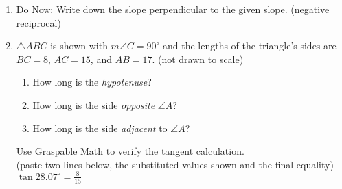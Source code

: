 \documentclass[12pt, twoside]{article}
\begin{document}
\begin{enumerate}
\newpage
\item Do Now: Write down the slope perpendicular to the given slope. (negative reciprocal) \vspace{0.5cm}
\begin{enumerate}
\end{enumerate}

\newpage
\item $\triangle ABC$ is shown with $m\angle C=90^\circ$ and the lengths of the triangle's sides are $BC=8$, $AC=15$, and $AB=17$. (not drawn to scale)
  \begin{multicols}{2}
    \begin{enumerate}
      \item How long is the \emph{hypotenuse}? \vspace{0.75cm}
      \item How long is the side \emph{opposite} $\angle A$? \vspace{0.75cm}
      \item How long is the side \emph{adjacent} to $\angle A$? \vspace{0.75cm}
    \end{enumerate}
    \end{multicols}
    Use Graspable Math to verify the tangent calculation.\\ (paste two lines below, the substituted values shown and the final equality)\\[0.25cm]
      $\displaystyle \tan 28.07^\circ = \frac{8}{15}$


\end{enumerate}
\end{document}
